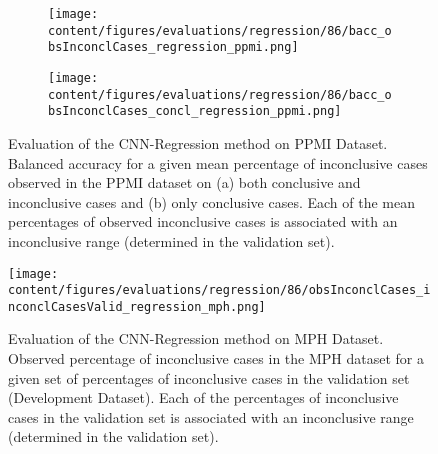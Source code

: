 \begin{figure}[t]
\begin{subfigure}{0.9\textwidth}
  \centering
  \texttt{[image: content/figures/evaluations/regression/86/bacc\_obsInconclCases\_regression\_ppmi.png]}
  \subcaption{}
  \label{fig:bacc_obsInconclCases_regression_ppmi}
\end{subfigure}
\hfill
\begin{subfigure}{0.9\textwidth}
  \centering
  \texttt{[image: content/figures/evaluations/regression/86/bacc\_obsInconclCases\_concl\_regression\_ppmi.png]}
  \subcaption{}
  \label{fig:bacc_obsInconclCases_concl_regression_ppmi}
\end{subfigure}

\caption{Evaluation of the CNN-Regression method on PPMI Dataset.
Balanced accuracy for a given mean percentage of inconclusive cases observed in the PPMI dataset on 
(a) both conclusive and inconclusive cases and (b) only conclusive cases. 
Each of the mean percentages of observed inconclusive cases is associated 
with an inconclusive range (determined in the validation set). }
\label{fig:bacc_obsInconclCases_regression_ppmi_full}
\end{figure}





\begin{figure}[h]
\centering
\texttt{[image: content/figures/evaluations/regression/86/obsInconclCases\_inconclCasesValid\_regression\_mph.png]}
\caption{Evaluation of the CNN-Regression method on MPH Dataset.
Observed percentage of inconclusive cases in the MPH dataset 
for a given set of percentages of inconclusive cases in the validation set (Development Dataset).
Each of the percentages of inconclusive cases in the validation set is associated 
with an inconclusive range (determined in the validation set).} 
\label{fig:obsInconclCases_inconclCasesValid_regression_mph}
\end{figure} 


